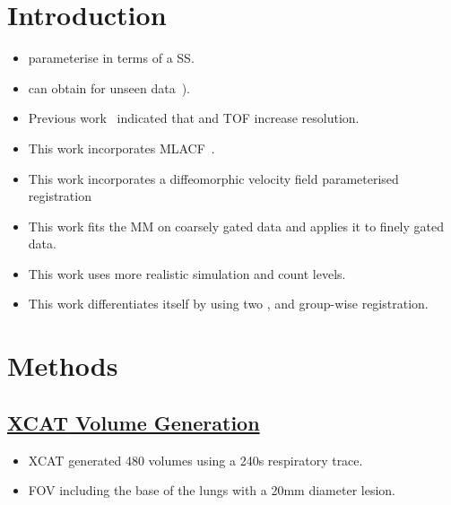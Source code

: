 \documentclass[portrait, color=UCLburgundy, margin=1cm]{uclposter}
\begin{document}
    \begin{multicols}{3}
        \section*{Introduction}
            \begin{highlightbox}[UCLlightgreen]
                \begin{itemize}
                    \item {} parameterise  in terms of a \gls{SS}.
                    \item {} can obtain  for unseen data~\cite{McClelland2013}).
                    \item Previous work~\cite{Whitehead2021ComparisonMap} indicated that  and \gls{TOF} increase resolution.
                    \item This work incorporates \acrshort{MLACF}~\cite{Nuyts2012ML-reconstructionFactors}.
                    \item This work incorporates a diffeomorphic velocity field parameterised registration
                    \item This work fits the \gls{MM} on coarsely gated data and applies it to finely gated data.
                    \item This work uses more realistic simulation and count levels.
                    \item This work differentiates itself by using two , and group-wise registration.
                \end{itemize}
            \end{highlightbox}
        
        \section*{Methods}
            \subsection*{\underline{\textbf{\acrshort{XCAT} Volume Generation}}}
                \begin{itemize}
                    \item \acrshort{XCAT} generated 480 volumes using a 240s respiratory trace.
                    \item \gls{FOV} including the base of the lungs with a 20mm diameter lesion.
                \end{itemize}
            

\end{multicols}
\end{document}

